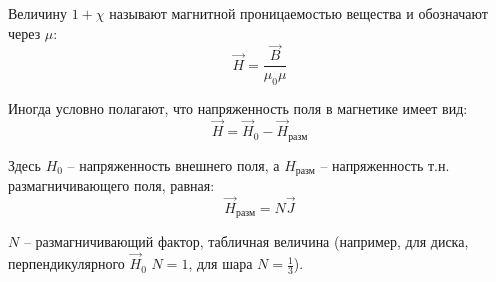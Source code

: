 \documentclass{article}
\begin{document}
	Величину $1+\chi$ называют магнитной проницаемостью вещества и обозначают через $\mu$:
	\begin{equation}
		\vec H = \frac{\vec B}{\mu_0\mu}
	\end{equation}

	Иногда условно полагают, что напряженность поля в магнетике имеет вид:
	\begin{equation}
		\vec H = \vec H_0 - \vec H_\text{разм}
	\end{equation}

	Здесь $H_0$ -- напряженность внешнего поля, а $H_\text{разм}$ -- напряженность т.н. размагничивающего поля, равная:
	\begin{equation}
		\vec H_\text{разм} = N\vec J
	\end{equation}

	$N$ -- размагничивающий фактор, табличная величина (например, для диска, перпендикулярного $\vec H_0$ $N=1$, для шара $N=\frac{1}{3}$).
	
\end{document}
